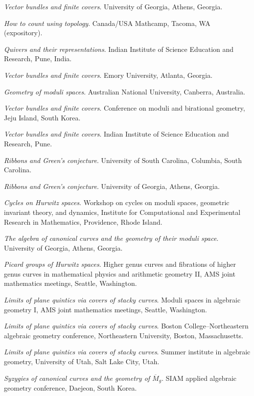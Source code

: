 \documentclass[11pt]{article}
\begin{document}
\begin{description}
\emph{Vector bundles and finite covers}.
University of Georgia, Athens, Georgia.

\emph{How to count using topology}.
Canada/USA Mathcamp, Tacoma, WA (expository).

\emph{Quivers and their representations}.
Indian Institute of Science Education and Research, Pune, India.

\emph{Vector bundles and finite covers}.
Emory University, Atlanta, Georgia.
\item[{2016}] \emph{Geometry of moduli spaces}.
Australian National University, Canberra, Australia.

\emph{Vector bundles and finite covers}.
Conference on moduli and birational geometry, Jeju Island, South Korea.

\emph{Vector bundles and finite covers}.
Indian Institute of Science Education and Research, Pune.

\emph{Ribbons and Green's conjecture}.
University of South Carolina, Columbia, South Carolina.

\emph{Ribbons and Green's conjecture}.
University of Georgia, Athens, Georgia.

\emph{Cycles on Hurwitz spaces}.
Workshop on cycles on moduli spaces, geometric invariant theory, and dynamics, Institute for Computational and Experimental Research in Mathematics, Providence, Rhode Island.

\emph{The algebra of canonical curves and the geometry of their moduli space}.
University of Georgia, Athens, Georgia.

\emph{Picard groups of Hurwitz spaces}.
Higher genus curves and fibrations of higher genus curves in mathematical physics and arithmetic geometry II, AMS joint mathematics meetings, Seattle, Washington.

\emph{Limits of plane quintics via covers of stacky curves}.
Moduli spaces in algebraic geometry I, AMS joint mathematics meetings, Seattle, Washington.
\item[{2015}] \emph{Limits of plane quintics via covers of stacky curves}.
Boston College--Northeastern algebraic geometry conference, Northeastern University, Boston, Massachusetts.

\emph{Limits of plane quintics via covers of stacky curves}.
Summer institute in algebraic geometry, University of Utah, Salt Lake City, Utah.

\emph{Syzygies of canonical curves and the geometry of \(\overline M_g\)}.
SIAM applied algebraic geometry conference, Daejeon, South Korea.


\end{description}
\end{document}

